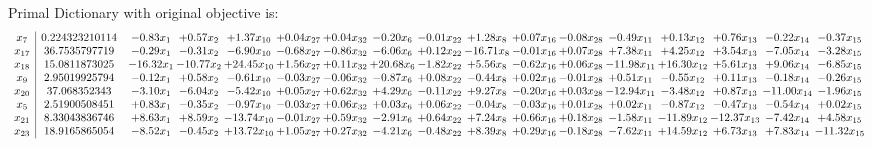 \documentclass[9pt]{article}
\begin{document}
Primal Dictionary with original objective is:
\[\begin{array}{c| c c@{\hskip 2pt} c@{\hskip 2pt} c@{\hskip 2pt} c@{\hskip 2pt} c@{\hskip 2pt} c@{\hskip 2pt} c@{\hskip 2pt} c@{\hskip 2pt} c@{\hskip 2pt} c@{\hskip 2pt} c@{\hskip 2pt} c@{\hskip 2pt} c@{\hskip 2pt} c@{\hskip 2pt} c@{\hskip 2pt} }
 x_{7}   &  0.224323210114 & -0.83 x_{1} & +  0.57 x_{2} & +  1.37 x_{10} & +  0.04 x_{27} & +  0.04 x_{32} & -0.20 x_{6} & -0.01 x_{22} & +  1.28 x_{8} & +  0.07 x_{16} & -0.08 x_{28} & -0.49 x_{11} & +  0.13 x_{12} & +  0.76 x_{13} & -0.22 x_{14} & -0.37 x_{15}\\
 x_{17}   &  36.7535797719 & -0.29 x_{1} & -0.31 x_{2} & -6.90 x_{10} & -0.68 x_{27} & -0.86 x_{32} & -6.06 x_{6} & +  0.12 x_{22} & -16.71 x_{8} & -0.01 x_{16} & +  0.07 x_{28} & +  7.38 x_{11} & +  4.25 x_{12} & +  3.54 x_{13} & -7.05 x_{14} & -3.28 x_{15}\\
 x_{18}   &  15.0811873025 & -16.32 x_{1} & -10.77 x_{2} & + 24.45 x_{10} & +  1.56 x_{27} & +  0.11 x_{32} & + 20.68 x_{6} & -1.82 x_{22} & +  5.56 x_{8} & -0.62 x_{16} & +  0.06 x_{28} & -11.98 x_{11} & + 16.30 x_{12} & +  5.61 x_{13} & +  9.06 x_{14} & -6.85 x_{15}\\
 x_{9}   &  2.95019925794 & -0.12 x_{1} & +  0.58 x_{2} & -0.61 x_{10} & -0.03 x_{27} & -0.06 x_{32} & -0.87 x_{6} & +  0.08 x_{22} & -0.44 x_{8} & +  0.02 x_{16} & -0.01 x_{28} & +  0.51 x_{11} & -0.55 x_{12} & +  0.11 x_{13} & -0.18 x_{14} & -0.26 x_{15}\\
 x_{20}   &  37.068352343 & -3.10 x_{1} & -6.04 x_{2} & -5.42 x_{10} & +  0.05 x_{27} & +  0.62 x_{32} & +  4.29 x_{6} & -0.11 x_{22} & +  9.27 x_{8} & -0.20 x_{16} & +  0.03 x_{28} & -12.94 x_{11} & -3.48 x_{12} & +  0.87 x_{13} & -11.00 x_{14} & -1.96 x_{15}\\
 x_{5}   &  2.51900508451 & +  0.83 x_{1} & -0.35 x_{2} & -0.97 x_{10} & -0.03 x_{27} & +  0.06 x_{32} & +  0.03 x_{6} & +  0.06 x_{22} & -0.04 x_{8} & -0.03 x_{16} & +  0.01 x_{28} & +  0.02 x_{11} & -0.87 x_{12} & -0.47 x_{13} & -0.54 x_{14} & +  0.02 x_{15}\\
 x_{21}   &  8.33043836746 & +  8.63 x_{1} & +  8.59 x_{2} & -13.74 x_{10} & -0.01 x_{27} & +  0.59 x_{32} & -2.91 x_{6} & +  0.64 x_{22} & +  7.24 x_{8} & +  0.66 x_{16} & +  0.18 x_{28} & -1.58 x_{11} & -11.89 x_{12} & -12.37 x_{13} & -7.42 x_{14} & +  4.58 x_{15}\\
 x_{23}   &  18.9165865054 & -8.52 x_{1} & -0.45 x_{2} & + 13.72 x_{10} & +  1.05 x_{27} & +  0.27 x_{32} & -4.21 x_{6} & -0.48 x_{22} & +  8.39 x_{8} & +  0.29 x_{16} & -0.18 x_{28} & -7.62 x_{11} & + 14.59 x_{12} & +  6.73 x_{13} & +  7.83 x_{14} & -11.32 x_{15}\\

\end{array}\]
\end{document}
